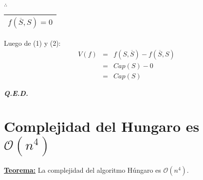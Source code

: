 \documentclass[12pt,a4paper]{report}
\newcommand{\QED}{\hfill \textit{\textbf{Q.E.D.}}}
\begin{document}
\begin{enumerate}[(1)]
							\vspace{3mm}
							\par $\therefore$ \begin{tabular}{|c|} \hline $ f(\overline{S}, S) = 0 $ \\\hline \end{tabular}
					\end{enumerate}

					\par Luego de (1) y (2):
					\begin{eqnarray}
						\nonumber V(f) &=& f(S, \overline{S}) - f(\overline{S}, S)\\
						\nonumber &=& Cap(S) - 0 \\
						\nonumber &=& Cap(S)
					\end{eqnarray}

		\QED

	\section{Complejidad del Hungaro es $\mathcal{O}(n^{4})$}
		\textbf{\underline{Teorema:}} La complejidad del algoritmo Húngaro es $\mathcal{O}(n^{4})$.
\end{document}

